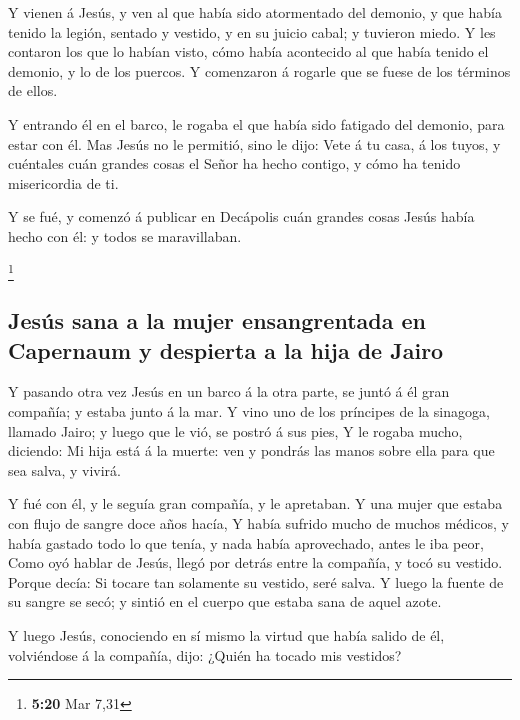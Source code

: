  Y vienen á Jesús, y ven al que había sido atormentado del
demonio, y que había tenido la legión, sentado y vestido, y en su juicio
cabal; y tuvieron miedo.  Y les contaron los que lo habían
visto, cómo había acontecido al que había tenido el demonio, y lo de los
puercos.  Y comenzaron á rogarle que se fuese de los
términos de ellos.

 Y entrando él en el barco, le rogaba el que había sido
fatigado del demonio, para estar con él.  Mas Jesús no le
permitió, sino le dijo: Vete á tu casa, á los tuyos, y cuéntales cuán
grandes cosas el Señor ha hecho contigo, y cómo ha tenido misericordia
de ti.

 Y se fué, y comenzó á publicar en Decápolis cuán grandes
cosas Jesús había hecho con él: y todos se maravillaban.

\footnote{\textbf{5:20} Mar 7,31}

\hypertarget{jesuxfas-sana-a-la-mujer-ensangrentada-en-capernaum-y-despierta-a-la-hija-de-jairo}{%
\subsection{Jesús sana a la mujer ensangrentada en Capernaum y despierta
a la hija de
Jairo}\label{jesuxfas-sana-a-la-mujer-ensangrentada-en-capernaum-y-despierta-a-la-hija-de-jairo}}

 Y pasando otra vez Jesús en un barco á la otra parte, se
juntó á él gran compañía; y estaba junto á la mar.  Y vino
uno de los príncipes de la sinagoga, llamado Jairo; y luego que le vió,
se postró á sus pies,  Y le rogaba mucho, diciendo: Mi hija
está á la muerte: ven y pondrás las manos sobre ella para que sea salva,
y vivirá.

 Y fué con él, y le seguía gran compañía, y le apretaban.
 Y una mujer que estaba con flujo de sangre doce años
hacía,  Y había sufrido mucho de muchos médicos, y había
gastado todo lo que tenía, y nada había aprovechado, antes le iba peor,
 Como oyó hablar de Jesús, llegó por detrás entre la
compañía, y tocó su vestido.  Porque decía: Si tocare tan
solamente su vestido, seré salva.  Y luego la fuente de su
sangre se secó; y sintió en el cuerpo que estaba sana de aquel azote.

 Y luego Jesús, conociendo en sí mismo la virtud que había
salido de él, volviéndose á la compañía, dijo: ¿Quién ha tocado mis
vestidos?

